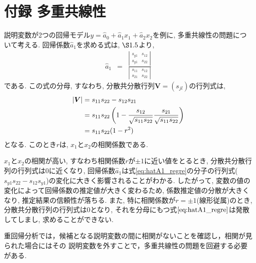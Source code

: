 \section*{付録 多重共線性}
説明変数が2つの回帰モデル$y=\hat{a}_0+\hat{a}_1x_1+\hat{a}_2x_2$を例に, 多重共線性の問題について考える. 回帰係数$\hat{a}_1$を求める式は, $\S1.5$より, 
\begin{eqnarray}
  \label{eq:hatA1_regre}
  \hat{a}_1
  &=&\frac{
    \left|
      \begin{array}{cc}
        s_{y1} &s_{12} \\
        s_{y1} &s_{22}
      \end{array}
    \right|
  }
  {
    \left|
      \begin{array}{cc}
        s_{11} &s_{12} \\
        s_{21} &s_{22}
      \end{array}
    \right|
  }
\end{eqnarray}
である. この式の分母, すなわち, 分散共分散行列$\bm{V}=(s_{jl})$の行列式は, 
\begin{align}
  \notag
  |\bm{V}| 
  &= s_{11}s_{22} - s_{12}s_{21} \\
  \notag
  &= s_{11}s_{22}\left(
    1 - \frac{s_{12}}{\sqrt{s_{11}s_{22}}} \frac{s_{21}}{\sqrt{s_{11}s_{22}}}
  \right)\\
  \label{eq:determinant_V}
  &= s_{11}s_{22}(1-r^2)
\end{align}
となる. このとき$r$は, $x_1$と$x_2$の相関係数である. 

$x_{1}$と$x_{2}$の相関が高い, すなわち相関係数$r$が$\pm 1$に近い値をとるとき, 分散共分散行列の行列式は0に近くなり, 回帰係数$\hat{a}_1$は式\eqref{eq:hatA1_regre}の分子の行列式($s_{y1}s_{22}-s_{12}s_{y1}$)の変化に大きく影響されることがわかる. したがって, 変数の値の変化によって回帰係数の推定値が大きく変わるため, 係数推定値の分散が大きくなり, 推定結果の信頼性が落ちる. また, 特に相関係数が$r=\pm 1$(線形従属)のとき, 分散共分散行列の行列式は0となり, それを分母にもつ式$\eqref{eq:hatA1_regre}$は発散してしまし, 求めることができない. 

重回帰分析では，候補となる説明変数の間に相関がないことを確認し，相関が見られた場合にはその 説明変数を外すことで，多重共線性の問題を回避する必要がある.
